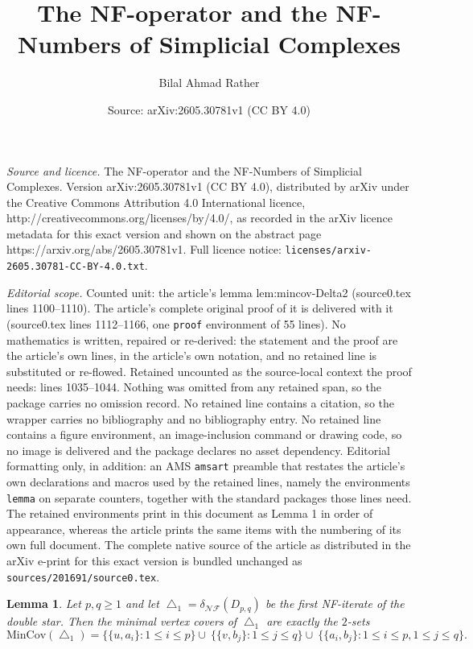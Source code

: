 \documentclass[10pt,a4paper]{amsart}
\title{The NF-operator and the NF-Numbers of Simplicial Complexes}
\author{Bilal Ahmad Rather}
\date{Source: arXiv:2605.30781v1 (CC BY 4.0)}
\newtheorem{lemma}{Lemma}
\newcommand{\MIN}{\mathrm{MinCov}}
\begin{document}
\maketitle

\noindent\emph{Source and licence.} The NF-operator and the NF-Numbers of Simplicial Complexes. Version arXiv:2605.30781v1 (CC BY 4.0), distributed by arXiv under the Creative Commons Attribution 4.0 International licence, http://creativecommons.org/licenses/by/4.0/, as recorded in the arXiv licence metadata for this exact version and shown on the abstract page https://arxiv.org/abs/2605.30781v1. Full licence notice: \texttt{licenses/arxiv-2605.30781-CC-BY-4.0.txt}.\par\smallskip

\noindent\textit{Editorial scope.} Counted unit: the article's lemma lem:mincov-Delta2 (source0.tex lines 1100--1110). The article's complete original proof of it is delivered with it (source0.tex lines 1112--1166, one \texttt{proof} environment of 55 lines). No mathematics is written, repaired or re-derived: the statement and the proof are the article's own lines, in the article's own notation, and no retained line is substituted or re-flowed.  Retained uncounted as the source-local context the proof needs: lines 1035--1044.  Nothing was omitted from any retained span, so the package carries no omission record.  No retained line contains a citation, so the wrapper carries no bibliography and no bibliography entry.  No retained line contains a figure environment, an image-inclusion command or drawing code, so no image is delivered and the package declares no asset dependency.  Editorial formatting only, in addition: an AMS \texttt{amsart} preamble that restates the article's own declarations and macros used by the retained lines, namely the environments \texttt{lemma} on separate counters, together with the standard packages those lines need.  The retained environments print in this document as Lemma 1 in order of appearance, whereas the article prints the same items with the numbering of its own full document.  The complete native source of the article as distributed in the arXiv e-print for this exact version is bundled unchanged as \texttt{sources/201691/source0.tex}.
		 \begin{lemma}\label{lem:mincov-Delta1}
			Let \(p,q\ge 1\) and let \(\bigtriangleup_1=\delta_{\mathcal{NF}}(D_{p,q})\) be the first NF-iterate of the double star.
			Then the minimal vertex covers of \(\bigtriangleup_1\) are exactly the \(2\)-sets
			\[
			\MIN(\bigtriangleup_1)=
			\bigl\{\{u,a_i\}:1\le i\le p\bigr\} \cup\
			\bigl\{\{v,b_j\}:1\le j\le q\bigr\} \cup\
			\bigl\{\{a_i,b_j\}:1\le i\le p, 1\le j\le q\bigr\}.
			\]
		\end{lemma}
\end{document}
